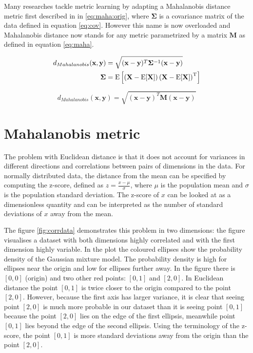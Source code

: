 \documentclass[12pt,a4paper]{report}
\begin{document}
Many researches tackle metric learning by adapting a Mahalanobis distance metric first described in \cite{mahalanobis1936generalized} in \ref{eq:maha:orig}, where $\bm{\Sigma}$ is a covariance matrix of the data defined in equation \ref{eq:cov}. However this name is now overloaded and Mahalanobis distance now stands for any metric parametrized by a matrix $\bm{M}$ as defined in equation \ref{eq:maha}.

\begin{align} \label{eq:maha:orig}
d_{Mahalanobis}(\textbf{x},\textbf{y}) &= \sqrt{(\textbf{x}-\textbf{y})^T\bm{\Sigma}^{-1}(\textbf{x}-\textbf{y})}  \\
\bm{\Sigma} &= \mathrm {E} \left[\left(\mathbf {X} -\mathrm {E} [\mathbf {X} ]\right)\left(\mathbf {X} -\mathrm {E} [\mathbf {X} ]\right)^{\rm {T}}\right] \label{eq:cov}
\end{align}

\begin{equation} \label{eq:maha}
d_{Mahalanobis}(\textbf{x},\textbf{y}) = \sqrt{(\textbf{x}-\textbf{y})^T\bm{M}(\textbf{x}-\textbf{y})} 
\end{equation}

\section{Mahalanobis metric}

The problem with Euclidean distance is that it does not account for variances in different directions and correlations between pairs of dimensions in the data. For normally distributed data, the distance from the mean can be specified by computing the z-score, defined as $z = \frac{x-\mu}{\sigma}$, where $\mu$ is the population mean and $\sigma$ is the population standard deviation. The z-score of $x$ can be looked at as a dimensionless quantity and can be interpreted as the number of standard deviations of $x$ away from the mean.

The figure \ref{fig:corrdata} demonstrates this problem in two dimensions: the figure visualises a dataset with both dimensions highly correlated and with the first dimension highly variable. In the plot the coloured ellipses show the probability density of the Gaussian mixture model. The probability density is high for ellipses near the origin and low for ellipses further away. In the figure there is $[0,0]$ (origin) and two other red points: $[0,1]$ and $[2,0]$. In Euclidean distance the point $[0,1]$ is twice closer to the origin compared to the point $[2,0]$. However, because the first axis has larger variance, it is clear that seeing point $[2,0]$ is much more probable in our dataset than it is seeing point $[0,1]$ because the point $[2,0]$ lies on the edge of the first ellipsis, meanwhile point $[0,1]$ lies beyond the edge of the second ellipsis. Using the terminology of the z-score, the point $[0,1]$ is more standard deviations away from the origin than the point $[2,0]$.
\end{document}
